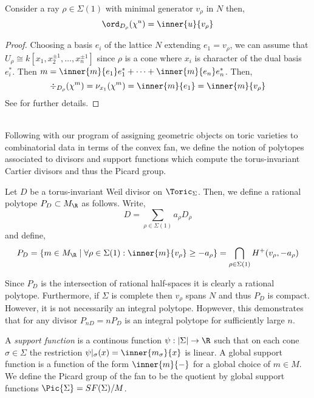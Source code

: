 \begin{lemma}
Consider a ray $\rho \in \Sigma(1)$ with minimal generator $v_\rho$ in $N$ then,
\[ \ord_{D_\rho}(\chi^u) = \inner{u}{v_\rho} \]
\end{lemma}

\begin{proof}
Choosing a basis $e_i$ of the lattice $N$ extending $e_1 = v_\rho$, we can assume that $U_\rho \cong k[x_1, x_2^{\pm 1}, \dots, x_n^{\pm 1}]$ since $\rho$ is a cone where $x_i$ is character of the dual basis $e_i^*$. Then $m = \inner{m}{e_1} e_1^* + \cdots + \inner{m}{e_n} e_n^*$. Then,
\[ \div_{D_\rho}{(\chi^m)} = \nu_{x_1}(\chi^m) = \inner{m}{e_1} = \inner{m}{v_\rho} \]
See \cite[Prop. 4.1.1]{cox} for further details.
\end{proof}
\noindent\\
Following with our program of assigning geometric objects on toric varieties to combinatorial data in terms of the convex fan, we define the notion of polytopes associated to divisors and support functions which compute the torus-invariant Cartier divisors and thus the Picard group. 

\begin{defn}
Let $D$ be a torus-invariant Weil divisor on $\Toric_\Sigma$. Then, we define a rational polytope $P_D \subset M_\R$ as follows. Write,
\[ D = \sum_{\rho \in \Sigma(1)} a_\rho D_\rho \]
and define,
\[ P_D = \{ m \in M_\R \mid \forall \rho \in \Sigma(1) : \inner{m}{v_\rho} \ge - a_\rho \} = \bigcap_{\rho \in \Sigma(1)} H^+(v_\rho, -a_\rho) \]
\end{defn}

\begin{rmk}
Since $P_D$ is the intersection of rational half-spaces it is clearly a rational polytope. Furthermore, if $\Sigma$ is complete then $v_\rho$ spans $N$ and thus $P_D$ is compact. However, it is not necessarily an integral polytope. Hopwever, this demonstrates that for any divisor $P_{nD} = n P_D$ is an integral polytope for sufficiently large $n$. 
\end{rmk}

\begin{definition}
A \textit{support function} is a continous function $\psi : |\Sigma| \to \R$ such that on each cone $\sigma \in \Sigma$ the restriction $\psi |_\sigma(x) = \inner{m_\sigma}{x}$ is linear. A global support function is a function of the form $\inner{m}{-}$ for  a global choice of $m \in M$. We define the Picard group of the fan to be the quotient by global support functions $\Pic{\Sigma} = SF(\Sigma) / M$. 
\end{definition}

